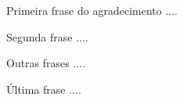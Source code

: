\begin{agradecimentos}
	Primeira frase do agradecimento ....
	
	Segunda frase ....
	
	Outras frases ....
	
	Última frase ....
	
\end{agradecimentos}
